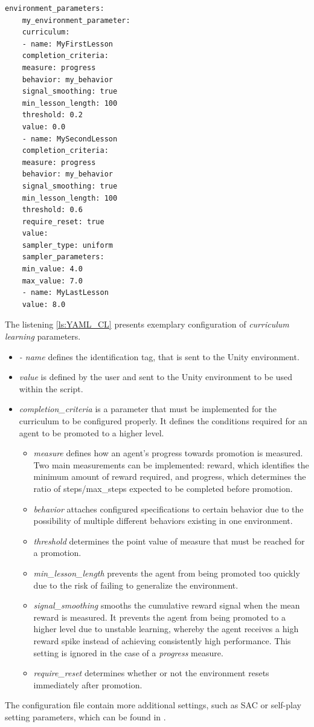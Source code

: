 \begin{lstlisting}[caption={Example of curriculum learning configuration.}, label={ls:YAML_CL}]
	environment_parameters:
	my_environment_parameter:
	curriculum:
	- name: MyFirstLesson 
	completion_criteria:
	measure: progress
	behavior: my_behavior
	signal_smoothing: true
	min_lesson_length: 100
	threshold: 0.2
	value: 0.0
	- name: MySecondLesson 
	completion_criteria:
	measure: progress
	behavior: my_behavior
	signal_smoothing: true
	min_lesson_length: 100
	threshold: 0.6
	require_reset: true
	value:
	sampler_type: uniform
	sampler_parameters:
	min_value: 4.0
	max_value: 7.0
	- name: MyLastLesson
	value: 8.0
\end{lstlisting}
The listening \ref{ls:YAML_CL} presents exemplary configuration of \textit{curriculum learning} parameters.
\begin{itemize}
	\item \textit{- name} defines the identification tag, that is sent to the Unity environment.
	\item \textit{value} is defined by the user and sent to the Unity environment to be used within the script.
	\item \textit{completion\_criteria} is a parameter that must be implemented for the curriculum to be configured properly. It defines the conditions required for an agent to be promoted to a higher level.
	\begin{itemize}
		\item \textit{measure} defines how an agent's progress towards promotion is measured. Two main measurements can be implemented: reward, which identifies the minimum amount of reward required, and progress, which determines the ratio of steps/max\_steps expected to be completed before promotion.
		\item \textit{behavior} attaches configured specifications to certain behavior due to the possibility of multiple different behaviors existing in one environment.
		\item \textit{threshold} determines the point value of measure that must be reached for a promotion.
		\item \textit{min\_lesson\_length} prevents the agent from being promoted too quickly due to the risk of failing to generalize the environment.
		\item \textit{signal\_smoothing} smooths the cumulative reward signal when the mean reward is measured. It prevents the agent from being promoted to a higher level due to unstable learning, whereby the agent receives a high reward spike instead of achieving consistently high performance. This setting is ignored in the case of a \textit{progress} measure.
		\item \textit{require\_reset} determines whether or not the environment resets immediately after promotion.
	\end{itemize}
\end{itemize}
The configuration file contain more additional settings, such as SAC or self-play setting parameters, which can be found in \cite{unitymlagentsConfFile}.

